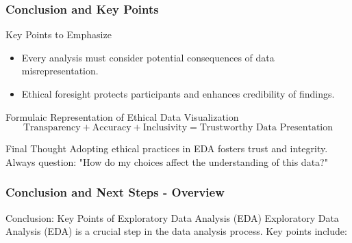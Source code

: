 \documentclass[aspectratio=169]{beamer}
\begin{document}
\begin{frame}[fragile]
    \frametitle{Conclusion and Key Points}
    \begin{block}{Key Points to Emphasize}
        \begin{itemize}
            \item Every analysis must consider potential consequences of data misrepresentation.
            \item Ethical foresight protects participants and enhances credibility of findings.
        \end{itemize}
    \end{block}
    
    \begin{block}{Formulaic Representation of Ethical Data Visualization}
        \begin{equation}
            \text{Transparency} + \text{Accuracy} + \text{Inclusivity} = \text{Trustworthy Data Presentation}
        \end{equation}
    \end{block}
    
    \begin{block}{Final Thought}
        Adopting ethical practices in EDA fosters trust and integrity. Always question: "How do my choices affect the understanding of this data?"
    \end{block}
\end{frame}

\begin{frame}[fragile]
    \frametitle{Conclusion and Next Steps - Overview}
    \begin{block}{Conclusion: Key Points of Exploratory Data Analysis (EDA)}
        Exploratory Data Analysis (EDA) is a crucial step in the data analysis process. Key points include:
    \end{block}
\end{frame}
\end{document}
